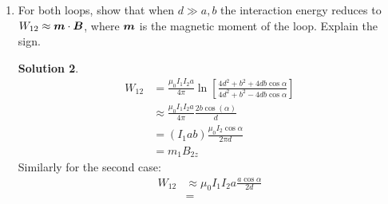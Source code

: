 \documentclass[letter,12pt]{article}
\theoremstyle{definition}
\newtheorem*{sol}{Solution}
\begin{document}
\begin{enumerate}
\begin{enumerate}
\begin{sol}
\begin{align*}
                        \int d\phi\; a \cos \phi B_x(a \cos \phi, 0)
                    \end{align*}
                    yielding
                    \begin{align*}
                        F_x &= \mu_0 I_1 I_2
                        \Re\left[
                            \frac{1}{\sqrt{1 - \left(
                                \frac{a}{d}E^{i\alpha}
                            \right)}}
                        \right]
                        \\
                        F_z &= \mu_0 I_1 I_2
                        \Im\left[
                            \frac{1}{\sqrt{1 - \left(
                                \frac{a}{d}E^{i\alpha}
                            \right)}}
                        \right]
                    \end{align*}
                \end{sol}
            \item
                For both loops, show that when $d \gg a,b$ the
                interaction energy reduces to $W_{12} \approx \boldsymbol{m}
                \cdot \boldsymbol{B}$, where $\boldsymbol{m}$ is the magnetic moment
                of the loop. Explain the sign.
                \begin{sol}
                    \begin{align}
                        W_{12} &=
                        \frac{\mu_0 I_1 I_2 a} {4 \pi}
                        \ln
                        \left[
                            \frac
                            {4d^2 + b^2 + 4db \cos \alpha}
                            {4d^2 + b^2 - 4db \cos \alpha}
                        \right]
                        \\
                        &\approx
                        \frac{\mu_0I_1I_2a}{4\pi}
                        \frac{2b\cos(\alpha)}{d}
                        \\
                        &=
                        (I_1ab) \frac{\mu_0 I_2 \cos \alpha}{2 \pi d}
                        \\
                        &=
                        m_1 B_{2z}
                    \end{align}
                    Similarly for the second case:
                    \begin{align*}
                        W_{12} &\approx \mu_0 I_1 I_2 a \frac{a \cos \alpha}{2d}
                        \\
                        &=

\end{align*}
\end{sol}
\end{enumerate}
\end{enumerate}
\end{document}
